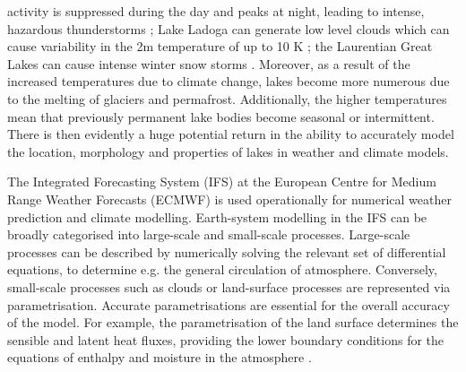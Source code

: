 \documentclass[hess, twostagejnl]{copernicus}
\providecommand{\DIFadd}[1]{{\protect\color{blue} \sf #1}} %
\providecommand{\DIFdel}[1]{{\protect\color{red} \scriptsize #1}} %
\providecommand{\DIFaddbegin}{} %
\providecommand{\DIFaddend}{} %
\providecommand{\DIFdelbegin}{} %
\providecommand{\DIFdelend}{} %
\begin{document}
activity is suppressed during the day and peaks at night, leading to intense, hazardous thunderstorms \DIFdelbegin \DIFdel{\cite{Thiery2015,Thiery_2017}}\DIFdelend \DIFaddbegin \DIFadd{\citep{Thiery2015,Thiery_2017}}\DIFaddend ; Lake Ladoga can generate low level clouds which can cause variability in the 2m temperature of up to 10 K \DIFdelbegin \DIFdel{\cite{Eerola2014}}\DIFdelend \DIFaddbegin \DIFadd{\citep{Eerola2014}}\DIFaddend ; the Laurentian Great Lakes can cause intense winter snow storms \DIFdelbegin \DIFdel{\cite{Vavrus2013} \cite{Notaro2013}}\DIFdelend \DIFaddbegin \DIFadd{\citep{Notaro2013,Vavrus2013}}\DIFaddend . Moreover, as a result of the increased temperatures due to climate change, lakes become more numerous due to the melting of glaciers and permafrost. Additionally, the higher temperatures mean that previously permanent lake bodies become seasonal or intermittent. There is then evidently a huge potential return in the ability to accurately model the location, morphology and properties of lakes in weather and climate models. \newline 


\noindent The Integrated Forecasting System (IFS) at the European Centre for Medium Range Weather Forecasts (ECMWF) is used operationally for numerical weather prediction and climate modelling. Earth-system modelling in the IFS can be broadly categorised into large-scale and small-scale processes. Large-scale processes can be described by numerically solving the relevant set of differential equations, to determine e.g. the general circulation of atmosphere. Conversely, small-scale processes such as clouds or land-surface processes are represented via parametrisation. Accurate parametrisations are essential for the overall accuracy of the model. For example, the parametrisation of the land surface determines the sensible and latent heat fluxes, providing the lower boundary conditions for the equations of enthalpy and moisture in the atmosphere \DIFdelbegin \DIFdel{\cite{p16960}}\DIFdelend \DIFaddbegin \DIFadd{\citep{p16960}}\DIFaddend . \newline 
\end{document}
